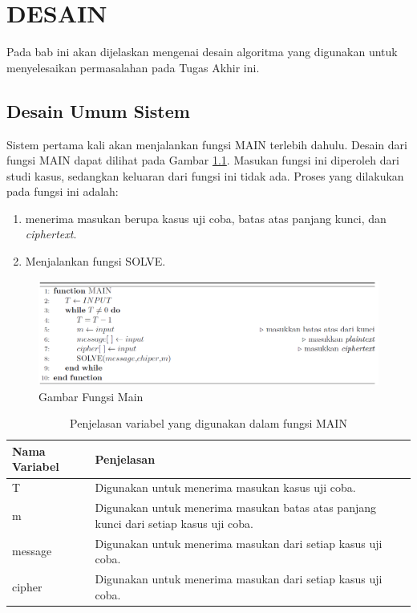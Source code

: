 \chapter{DESAIN}
\label{chapter:design}
Pada bab ini akan dijelaskan mengenai desain algoritma yang digunakan untuk menyelesaikan permasalahan pada Tugas Akhir ini.
\section{Desain Umum Sistem}	
Sistem pertama kali akan menjalankan fungsi MAIN terlebih dahulu. Desain dari fungsi MAIN dapat dilihat pada Gambar \ref{fig:mainfx}. Masukan fungsi ini diperoleh dari studi kasus, sedangkan keluaran dari fungsi ini tidak ada. Proses yang dilakukan pada fungsi ini adalah:
\begin{enumerate}
\item menerima masukan berupa kasus uji coba, batas atas panjang kunci, \plaintext dan \textit{ciphertext}.
\item Menjalankan fungsi SOLVE.
\end{enumerate}


\begin{figure}[H]
		\centering
		
		\includegraphics[scale=0.31]{images/bab3/mainfx.png}
		\caption{Gambar Fungsi Main}
		\label{fig:mainfx}
	\end{figure}
	
\begin{table}[H]
	 	\caption{Penjelasan variabel yang digunakan dalam fungsi MAIN}
		\begin{tabular}   {|p{3cm}|p{6cm}|}\hline
		Nama Variabel&Penjelasan \\ \hline
		T&Digunakan untuk menerima masukan kasus uji coba. \\ \hline
		m&Digunakan untuk menerima masukan batas atas panjang kunci dari setiap kasus uji coba. \\ \hline
		message&Digunakan untuk menerima masukan \plaintext dari setiap kasus uji coba.\\ \hline
		cipher&Digunakan untuk menerima masukan \ciphertext dari setiap kasus uji coba. \\ \hline
		\end{tabular}%
		\label{tab:mainvar}
	\end{table}
	
